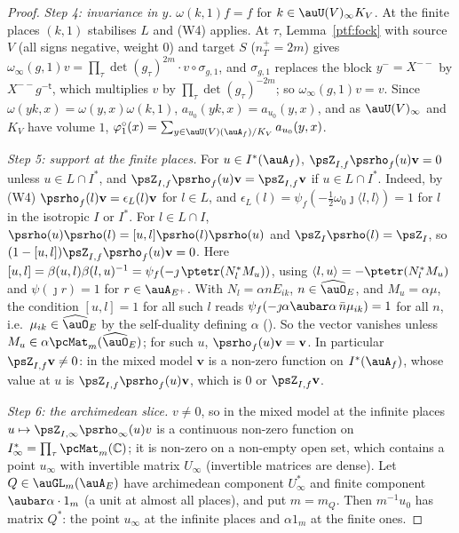 \documentclass[10pt]{amsart}
\theoremstyle{definition}
\theoremstyle{remark}
\newcommand{\C}{\mathbb C}
\providecommand{\psvac}{\mathbf v}
\begin{document}
\begin{proof}
\emph{Step 4: invariance in $y$.} $\omega(k,1)f=f$ for $k\in\auU(V)_\infty K_V$. At the finite places $(k,1)$
stabilises $L$ and (W4) applies. At $\tau$, Lemma~\ref{ptf:fock} with source $V$ (all signs negative,
weight $0$) and target $S$ ($n_T^+=2m$) gives $\omega_\infty(g,1)v=\prod_\tau\det(g_\tau)^{2m}\cdot
v\circ\sigma_{g,1}$, and $\sigma_{g,1}$ replaces the block $y^-=X^{--}$ by $X^{--}g^{-\mathsf t}$, which
multiplies $v$ by $\prod_\tau\det(g_\tau)^{-2m}$; so $\omega_\infty(g,1)v=v$. Since $\omega(yk,x)=\omega(y,x)
\omega(k,1)$, $a_{u_0}(yk,x)=a_{u_0}(y,x)$, and as $\auU(V)_\infty$ and $K_V$ have volume $1$,
$\varphi^\circ_1(x)=\sum_{y\in\auU(V)(\auA_f)/K_V}a_{u_0}(y,x)$.

\emph{Step 5: support at the finite places.} For $u\in I^*(\auA_f)$, $\psZ_{I,f}\psrho_f(u)\psvac=0$ unless
$u\in L\cap I^*$, and $\psZ_{I,f}\psrho_f(u)\psvac=\psZ_{I,f}\psvac$ if $u\in L\cap I^*$. Indeed, by (W4)
$\psrho_f(l)\psvac=\epsilon_L(l)\psvac$ for $l\in L$, and $\epsilon_L(l)=\psi_f(-\frac12\omega_0\jmath\langle
l,l\rangle)=1$ for $l$ in the isotropic $I$ or $I^*$. For $l\in L\cap I$, $\psrho(u)\psrho(l)=[u,l]\psrho(l)
\psrho(u)$ and $\psZ_I\psrho(l)=\psZ_I$, so $(1-[u,l])\psZ_{I,f}\psrho_f(u)\psvac=0$. Here
$[u,l]=\beta(u,l)\beta(l,u)^{-1}=\psi_f(-\jmath\,\ptetr(N_l^*M_u))$, using $\langle l,u\rangle=-\ptetr(N_l^*M_u)$
and $\psi(\jmath r)=1$ for $r\in\auA_{E^+}$. With $N_l=\alpha nE_{ik}$, $n\in\widehat\auO_E$, and
$M_u=\alpha\mu$, the condition $[u,l]=1$ for all such $l$ reads $\psi_f(-\jmath\alpha\aubar\alpha\,\bar n\mu_{ik})=1$
for all $n$, i.e.\ $\mu_{ik}\in\widehat\auO_E$ by the self-duality defining $\alpha$ ({\cite[\S5.1.1]{P49}}).
So the vector vanishes unless $M_u\in\alpha\pcMat_m(\widehat\auO_E)$; for such $u$, $\psrho_f(u)\psvac=\psvac$.
In particular $\psZ_{I,f}\psvac\ne0$: in the mixed model $\psvac$ is a non-zero function on $I^*(\auA_f)$,
whose value at $u$ is $\psZ_{I,f}\psrho_f(u)\psvac$, which is $0$ or $\psZ_{I,f}\psvac$.

\emph{Step 6: the archimedean slice.} $v\ne0$, so in the mixed model at the infinite places
$u\mapsto\psZ_{I,\infty}\psrho_\infty(u)v$ is a continuous non-zero function on $I^*_\infty=\prod_\tau
\pcMat_m(\C)$; it is non-zero on a non-empty open set, which contains a point $u_\infty$ with invertible
matrix $U_\infty$ (invertible matrices are dense). Let $Q\in\auGL_m(\auA_E)$ have archimedean component
$U_\infty^*$ and finite component $\aubar\alpha\cdot1_m$ (a unit at almost all places), and put $m=m_Q$. Then
$m^{-1}u_0$ has matrix $Q^*$: the point $u_\infty$ at the infinite places and $\alpha1_m$ at the finite ones.


\end{proof}
\end{document}
